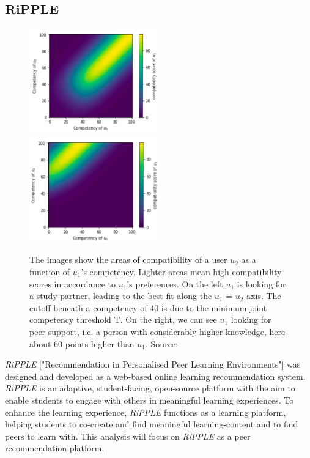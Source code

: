 \documentclass[conference]{IEEEtran}
\begin{document}
\subsection{RiPPLE} \label{paper:RiPPLE}
\begin{figure}[!t]
	\includegraphics[width=0.5\textwidth]{g/SeekingPartnerCompatibility.PNG}
	\includegraphics[width=0.5\textwidth]{g/SeekingSupportCompatibility.PNG}
	\caption{The images show the areas of compatibility of a user \(u_2\) as a function of \(u_1\)'s competency. Lighter areas mean high compatibility scores in accordance to \(u_1\)'s preferences. On the left \(u_1\) is looking for a study partner, leading to the best fit along the \(u_1\) = \(u_2\) axis. The cutoff beneath a competency of 40 is due to the minimum joint competency threshold T. On the right, we can see \(u_1\) looking for peer	 support, i.e. a person with considerably higher knowledge, here about 60 points higher than \(u_1\). Source: \cite{potts2018reciprocal}}
	\label{f:Seeking}
\end{figure}
\textit{RiPPLE} ["Recommendation in Personalised Peer Learning Environments"] was designed and developed as a web-based online learning recommendation system. \textit{RiPPLE} is an adaptive, student-facing, open-source platform with the aim to enable students to engage with others in meaningful learning experiences. To enhance the learning experience, \textit{RiPPLE} functions as a learning platform, helping students to co-create and find meaningful learning-content and to find peers to learn with. This analysis will focus on \textit{RiPPLE} as a peer recommendation platform.\\
\end{document}
